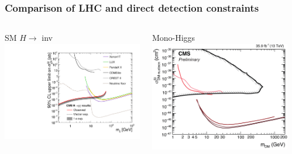 \documentclass[aspectratio=169,xcolor=dvipsnames,,table,compress]{beamer}
\begin{document}
\begin{frame} \frametitle{Comparison of LHC and direct detection constraints}
  \begin{columns}[T]
    \begin{column}{0.33\textwidth}
      \centering
      SM $H\rightarrow$ inv \\
      \includegraphics[width=\textwidth]{../figures/vbf/fits/dd.pdf}
    \end{column}
    \begin{column}{0.33\textwidth}
      \centering
      Mono-Higgs\\
      \includegraphics[width=\textwidth]{../figures/talk/monohiggs.png}
    \end{column}
    \begin{column}{0.33\textwidth}

\end{column}
\end{columns}
\end{frame}
\end{document}
